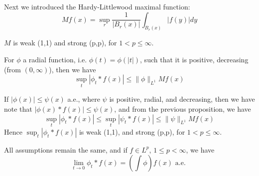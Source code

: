 \documentclass[lang=en,10pt, color=black]{../elegantbook}
\begin{document}
Next we introduced the Hardy-Littlewood maximal function:
\begin{equation*}
    Mf(x)=\sup_r\frac{1}{|B_r(x)|}\int_{B_r(x)}|f(y)|dy
\end{equation*}

\begin{theorem}
    $M$ is weak (1,1) and strong (p,p), for $1<p\leq\infty$.
\end{theorem}
\begin{comment}
    And we first showed that it is true for $n=1$, using a covering lemma.
\end{comment}

\begin{proposition}
    For $\phi$ a radial function, i.e. $\phi(t)=\phi(|t|)$, such that it is positive, decreasing (from $(0,\infty)$), then we have
    \begin{equation*}
        \sup_t|\phi_t\ast f(x)|\leq\|\phi\|_{L^1}Mf(x)
    \end{equation*}
\end{proposition}
\begin{comment}
    We showed that it is true for simple functions, and take the limit.
\end{comment}

\begin{corollary}
    If $|\phi(x)|\leq\psi(x)$ a.e., where $\psi$ is positive, radial, and decreasing, then we have note that $|\phi(x)\ast f(x)|\leq\psi(x)$, and from the previous proposition, we have
    \begin{equation*}
        \sup_t|\phi_t\ast f(x)|\leq\sup_t|\psi_t\ast f(x)|\leq\|\psi\|_{L^1}Mf(x)
    \end{equation*}
    Hence $\sup_t|\phi_t\ast f(x)|$ is weak (1,1), and strong (p,p), for $1<p\leq\infty$.
\end{corollary}
\begin{corollary}
    All assumptions remain the same, and if $f\in L^p$, $1\leq p<\infty$, we have
    \begin{equation*}
        \lim_{t\to 0}\phi_t\ast f(x)=\left(\int\phi\right)f(x) \text{ a.e. }
    \end{equation*}
\end{corollary}
\end{document}
